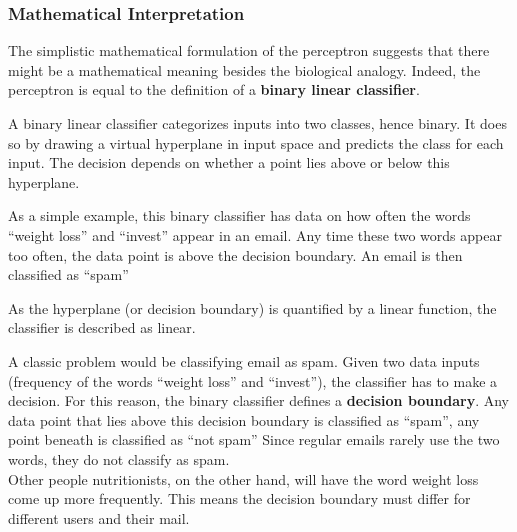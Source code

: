 \subsubsection{Mathematical Interpretation}
The simplistic mathematical formulation of the perceptron suggests that there might be a mathematical meaning besides the biological analogy.
Indeed, the perceptron is equal to the definition of a \textbf{binary linear classifier}.

A binary linear classifier categorizes inputs into two classes, hence binary.
It does so by drawing a virtual hyperplane in input space and predicts the class for each input.
The decision depends on whether a point lies above or below this hyperplane.
\begin{marginfigure}
    \resizebox{\textwidth}{!}{
        
    }
    \caption{As a simple example, this binary classifier has data on how often the words ``weight loss'' and ``invest'' appear in an email.
Any time these two words appear too often, the data point is above the decision boundary. An email is then classified as ``spam''}
\end{marginfigure}
As the hyperplane (or decision boundary) is quantified by a linear function, the classifier is described as linear.

A classic problem would be classifying email as spam.
Given two data inputs (\eg frequency of the words ``weight loss'' and ``invest''), the classifier has to make a decision.
For this reason, the binary classifier defines a \textbf{decision boundary}.
Any data point that lies above this decision boundary is classified as ``spam'', any point beneath is classified as ``not spam''
Since regular emails rarely use the two words, they do not classify as spam.\\
Other people \eg nutritionists, on the other hand, will have the word weight loss come up more frequently.
This means the decision boundary must differ for different users and their mail.

